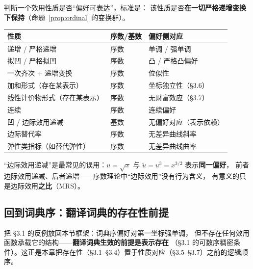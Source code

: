 \begin{remark}[判别清单]\label{rem:ordinal-checklist}
判断一个效用性质是否“偏好可表达”，标准是：
该性质是否\textbf{在一切严格递增变换下保持}（命题~\ref{prop:ordinal} 的变换群）。
\begin{center}
\small
\begin{tabular}{lll}
\toprule
性质 & 序数/基数 & 偏好侧对应 \\
\midrule
递增 / 严格递增 & 序数 & 单调 / 强单调 \\
拟凹 / 严格拟凹 & 序数 & 凸 / 严格凸偏好 \\
一次齐次 + 递增变换 & 序数 & 位似性 \\
加和形式（存在某表示） & 序数 & 坐标独立性（§3.6） \\
线性计价物形式（存在某表示） & 序数 & 无财富效应（§3.7） \\
连续 & 序数 & 连续偏好 \\
凹 / 边际效用递减 & 基数 & 无偏好对应（表示依赖） \\
边际替代率 & 序数 & 无差异曲线斜率 \\
弹性类指标（如替代弹性） & 序数 & 无差异曲线曲率 \\
\bottomrule
\end{tabular}
\end{center}
“边际效用递减”是最常见的误用：$u=\sqrt{x}$ 与 $\tilde u=u^3=x^{3/2}$ 表示\textbf{同一偏好}，
前者边际效用递减、后者递增——序数理论中“边际效用”没有行为含义，
有意义的只是边际效用\textbf{之比}（MRS）。
\end{remark}

\subsection{回到词典序：翻译词典的存在性前提}

把 §3.1 的反例放回本节框架：词典序偏好对第一坐标强单调，
但不存在任何效用函数承载它的结构——\textbf{翻译词典生效的前提是表示存在}
（§3.1 的可数序稠密条件）。这正是本章把存在性（§3.1--§3.4）置于性质对应（§3.5--§3.7）之前的逻辑顺序。
